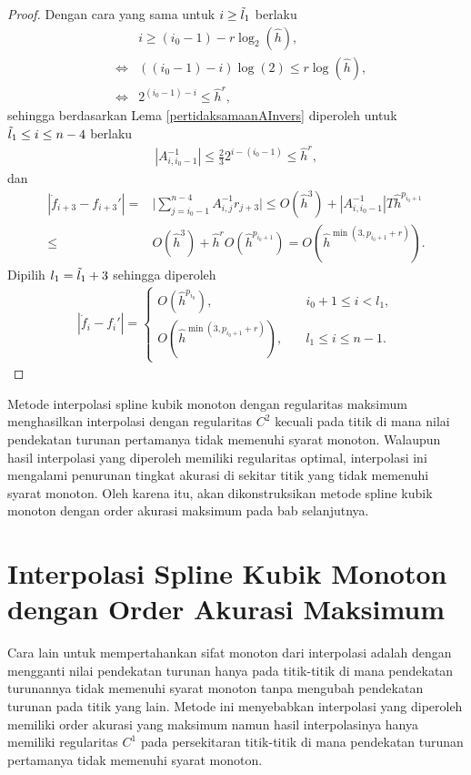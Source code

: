 \begin{proof}
    Dengan cara yang sama untuk $i \geq \Tilde{l}_1$ berlaku
    \begin{align*}
        && i \geq (i_0 - 1) - r\log_2(\hat{h}), \\
        &\Leftrightarrow& ((i_0 - 1) - i)\log(2) \leq r\log(\hat{h}), \\
        &\Leftrightarrow& 2^{(i_0 - 1) - i} \leq \hat{h}^r,
    \end{align*}
    sehingga berdasarkan Lema \ref{pertidaksamaanAInvers} diperoleh untuk $\Tilde{l}_1 \leq i \leq n-4$ berlaku 
    \begin{align*}
        |A_{i,{i_0-1}}^{-1}| \leq \frac{2}{3}2^{i-(i_0 - 1)} \leq \hat{h}^r,
    \end{align*}
    dan 
    \begin{align*}
        |\dot{f}_{i+3} - f_{i+3}'| =& \Bigg| \sum_{j=i_0-1}^{n - 4} A_{i,j}^{-1}r_{j+3} \Bigg| \leq O(\hat{h}^3) + |A_{i,{i_0-1}}^{-1}|T\hat{h}^{p_{i_0+1}} \\
        \leq& O(\hat{h}^3) + \hat{h}^rO(\hat{h}^{p_{i_0+1}}) = O(\hat{h}^{\min(3,p_{i_0+1}+r)}).
    \end{align*}
    Dipilih $l_1 = \Tilde{l}_1 + 3$ sehingga diperoleh
    \begin{align*}
        |\dot{f}_i - f_i'|=\begin{cases}
            O(\hat{h}^{p_{i_0}}), \quad &i_0 + 1 \leq i < l_1, \\
            O(\hat{h}^{\min(3,p_{i_0+1}+r)}), \quad &l_1 \leq i \leq n-1.
        \end{cases}
    \end{align*}
\end{proof}

Metode interpolasi spline kubik monoton dengan regularitas maksimum menghasilkan interpolasi dengan regularitas $C^2$ kecuali pada titik di mana nilai pendekatan turunan pertamanya tidak memenuhi syarat monoton. Walaupun hasil interpolasi yang diperoleh memiliki regularitas optimal, interpolasi ini mengalami penurunan tingkat akurasi di sekitar titik yang tidak memenuhi syarat monoton. Oleh karena itu, akan dikonstruksikan metode spline kubik monoton dengan order akurasi maksimum pada bab selanjutnya.

\section{Interpolasi Spline Kubik Monoton dengan Order Akurasi Maksimum}\label{4.3}

Cara lain untuk mempertahankan sifat monoton dari interpolasi adalah dengan mengganti nilai pendekatan turunan hanya pada titik-titik di mana pendekatan turunannya tidak memenuhi syarat monoton tanpa mengubah pendekatan turunan pada titik yang lain. Metode ini menyebabkan interpolasi yang diperoleh memiliki order akurasi yang maksimum namun hasil interpolasinya hanya memiliki regularitas $C^1$ pada persekitaran titik-titik di mana pendekatan turunan pertamanya tidak memenuhi syarat monoton.

